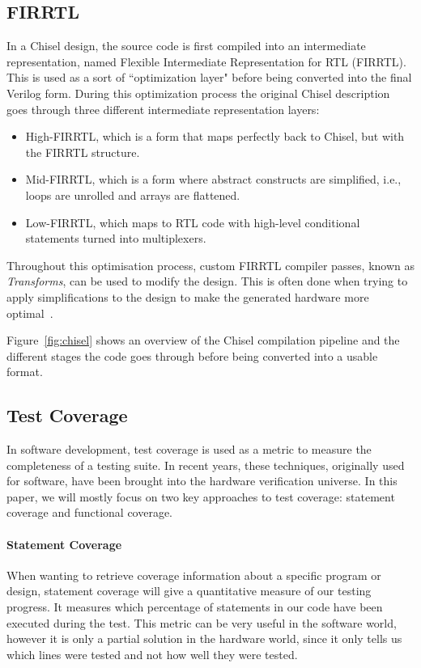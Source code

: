 \documentclass[conference]{IEEEtran}
\begin{document}
\subsection{FIRRTL}
In a Chisel design, the source code is first compiled into an intermediate representation, named Flexible Intermediate Representation for RTL (FIRRTL).
This is used as a sort of ``optimization layer" before being converted into the final Verilog form. 
During this optimization process the original Chisel description goes through three different intermediate representation layers:
\begin{itemize}
\item High-FIRRTL, which is a form that maps perfectly back to Chisel, but with the FIRRTL structure.
\item Mid-FIRRTL, which is a form where abstract constructs are simplified, i.e., loops are unrolled and arrays are flattened.
\item Low-FIRRTL, which maps to RTL code with high-level conditional statements turned into multiplexers.
\end{itemize}
Throughout this optimisation process, custom FIRRTL compiler passes, known as \textit{Transforms}, can be used to modify the design. 
This is often done when trying to apply simplifications to the design to make the generated hardware more optimal~\cite{firrtl}.  

Figure~\ref{fig:chisel} shows an overview of the Chisel compilation pipeline and the different stages the code goes through before being converted into a usable format.

\subsection{Test Coverage}
In software development, test coverage is used as a metric to measure the completeness of a testing suite. 
In recent years, these techniques, originally used for software, have been brought into the hardware verification universe. 
In this paper, we will mostly focus on two key approaches to test coverage: statement coverage and functional coverage. 

\paragraph{Statement Coverage} When wanting to retrieve coverage information about a specific program or design, statement coverage will give a quantitative measure of our testing progress. It measures which percentage of statements in our code have been executed during the test. This metric can be very useful in the software world, however it is only a partial solution in the hardware world, since it only tells us which lines were tested and not how well they were tested.
\end{document}
